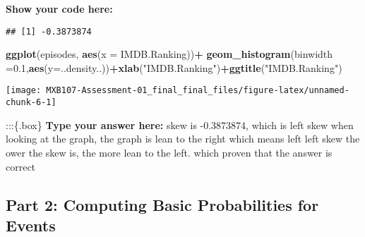 \documentclass[
]{article}
\newenvironment{Shaded}{\begin{snugshade}}{\end{snugshade}}
\newcommand{\CommentTok}[1]{\textcolor[rgb]{0.56,0.35,0.01}{\textit{#1}}}
\newcommand{\DataTypeTok}[1]{\textcolor[rgb]{0.13,0.29,0.53}{#1}}
\newcommand{\DecValTok}[1]{\textcolor[rgb]{0.00,0.00,0.81}{#1}}
\newcommand{\FloatTok}[1]{\textcolor[rgb]{0.00,0.00,0.81}{#1}}
\newcommand{\KeywordTok}[1]{\textcolor[rgb]{0.13,0.29,0.53}{\textbf{#1}}}
\newcommand{\NormalTok}[1]{#1}
\newcommand{\OperatorTok}[1]{\textcolor[rgb]{0.81,0.36,0.00}{\textbf{#1}}}
\newcommand{\StringTok}[1]{\textcolor[rgb]{0.31,0.60,0.02}{#1}}
\begin{document}
\textbf{Show your code here:}

\begin{Shaded}
\end{Shaded}

\begin{verbatim}
## [1] -0.3873874
\end{verbatim}

\begin{Shaded}
\begin{Highlighting}[]
\KeywordTok{ggplot}\NormalTok{(episodes,  }\KeywordTok{aes}\NormalTok{(}\DataTypeTok{x =}\NormalTok{ IMDB.Ranking))}\OperatorTok{+}
\StringTok{  }\KeywordTok{geom_histogram}\NormalTok{(}\DataTypeTok{binwidth =}\FloatTok{0.1}\NormalTok{,}\KeywordTok{aes}\NormalTok{(}\DataTypeTok{y=}\NormalTok{..density..))}\OperatorTok{+}\KeywordTok{xlab}\NormalTok{(}\StringTok{"IMDB.Ranking"}\NormalTok{)}\OperatorTok{+}\KeywordTok{ggtitle}\NormalTok{(}\StringTok{"IMDB.Ranking"}\NormalTok{)}
\end{Highlighting}
\end{Shaded}

\begin{center}\texttt{[image: MXB107-Assessment-01\_final\_final\_files/figure-latex/unnamed-chunk-6-1]} \end{center}

:::\{.box\} \textbf{Type your answer here:} skew is -0.3873874, which is
left skew when looking at the graph, the graph is lean to the right
which means left left skew the ower the skew is, the more lean to the
left. which proven that the answer is correct

\hypertarget{part-2-computing-basic-probabilities-for-events}{%
\subsection{Part 2: Computing Basic Probabilities for
Events}\label{part-2-computing-basic-probabilities-for-events}}
\end{document}
